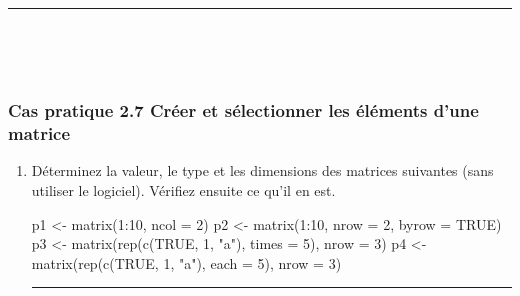 \documentclass[12pt,twosided, notitlepage]{book}
\newenvironment{Shaded}{}{}
\newcommand{\KeywordTok}[1]{\textcolor[rgb]{0.00,0.00,1.00}{#1}}
\newcommand{\DataTypeTok}[1]{#1}
\newcommand{\DecValTok}[1]{#1}
\newcommand{\StringTok}[1]{\textcolor[rgb]{0.00,0.50,0.50}{#1}}
\newcommand{\OtherTok}[1]{\textcolor[rgb]{1.00,0.25,0.00}{#1}}
\newcommand{\OperatorTok}[1]{#1}
\newcommand{\NormalTok}[1]{#1}
\newif \ifsol
\renewenvironment{Shaded}{\begin{snugshade}}{\end{snugshade}}
\begin{document}
\begin{center}\rule{0.5\linewidth}{\linethickness}\end{center}

~

~

\subsubsection{\texorpdfstring{\textbf{Cas pratique 2.7} Créer et
sélectionner les éléments d'une
matrice}{Cas pratique 2.7 Créer et sélectionner les éléments d'une matrice}}\label{cas-pratique-2.7-creer-et-selectionner-les-elements-dune-matrice}


\begin{enumerate}
\def\labelenumi{\alph{enumi}.}
\item
  Déterminez la valeur, le type et les dimensions des matrices suivantes
  (sans utiliser le logiciel). Vérifiez ensuite ce qu'il en
  est.

\begin{Shaded}
\begin{Highlighting}[]
\NormalTok{p1 <-}\StringTok{ }\KeywordTok{matrix}\NormalTok{(}\DecValTok{1}\OperatorTok{:}\DecValTok{10}\NormalTok{, }\DataTypeTok{ncol =} \DecValTok{2}\NormalTok{)}
\NormalTok{p2 <-}\StringTok{ }\KeywordTok{matrix}\NormalTok{(}\DecValTok{1}\OperatorTok{:}\DecValTok{10}\NormalTok{, }\DataTypeTok{nrow =} \DecValTok{2}\NormalTok{, }\DataTypeTok{byrow =} \OtherTok{TRUE}\NormalTok{)}
\NormalTok{p3 <-}\StringTok{ }\KeywordTok{matrix}\NormalTok{(}\KeywordTok{rep}\NormalTok{(}\KeywordTok{c}\NormalTok{(}\OtherTok{TRUE}\NormalTok{, }\DecValTok{1}\NormalTok{, }\StringTok{"a"}\NormalTok{), }\DataTypeTok{times =} \DecValTok{5}\NormalTok{), }\DataTypeTok{nrow =} \DecValTok{3}\NormalTok{)}
\NormalTok{p4 <-}\StringTok{ }\KeywordTok{matrix}\NormalTok{(}\KeywordTok{rep}\NormalTok{(}\KeywordTok{c}\NormalTok{(}\OtherTok{TRUE}\NormalTok{, }\DecValTok{1}\NormalTok{, }\StringTok{"a"}\NormalTok{), }\DataTypeTok{each =} \DecValTok{5}\NormalTok{), }\DataTypeTok{nrow =} \DecValTok{3}\NormalTok{)}
\end{Highlighting}
\end{Shaded}

  \ifsol 

  \begin{center} \rule{0.5\linewidth}{\linethickness}\end{center}


\end{enumerate}
\end{document}

